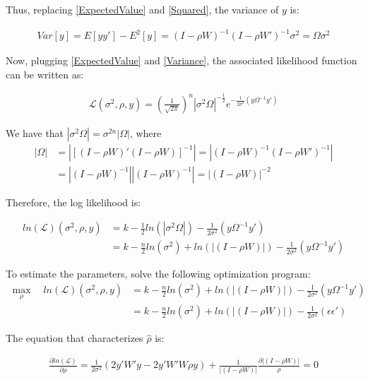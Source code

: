\documentclass[12pt]{article}
\begin{document}
\begin{enumerate}
\begin{enumerate}
\begin{enumerate}
      Thus, replacing \eqref{ExpectedValue} and \eqref{Squared}, the variance of $y$ is:
      
      \begin{align}
          Var[y]= E[yy'] - E^2[y] = (I-\rho W)^{-1} (I-\rho W')^{-1} \sigma^2 = \Omega \sigma^2 \label{Variance}
      \end{align}

     Now, plugging \eqref{ExpectedValue} and \eqref{Variance}, the associated likelihood function can be written as: 
     
     \begin{align*}
     \mathcal{L} (\sigma^2, \rho, y) = \left( \frac{1}{\sqrt{2 \pi}}\right)^n |\sigma^2 \Omega|^{-\frac{1}{2}} e^{-\frac{1}{2\sigma^2} (y \Omega^{-1} y')}
     \end{align*}
     
     We have that $|\sigma^2 \Omega| = \sigma^{2n} |\Omega|$, where
     \begin{align*}
         |\Omega| &= |[(I-\rho W)'(I-\rho W)]^{-1}| = |(I-\rho W)^{-1}(I-\rho W')^{-1}|\\
         &= |(I-\rho W)^{-1}| |(I-\rho W)^{-1}| = |(I-\rho W)|^{-2}
     \end{align*}
      
      Therefore, the log likelihood is:
      
      \begin{align*}
     ln(\mathcal{L}) (\sigma^2, \rho, y) &= k - \frac{1}{2} ln(|\sigma^2 \Omega|) - \frac{1}{2 \sigma^2} (y \Omega^{-1} y')\\
     &= k - \frac{n}{2} ln(\sigma^2) + ln(|(I-\rho W)|) - \frac{1}{2 \sigma^2} (y \Omega^{-1} y')
     \end{align*}
     
     To estimate the parameters, solve the following optimization program:
      \begin{align*}
          \max_{\rho} \quad ln(\mathcal{L}) (\sigma^2, \rho, y) &= k - \frac{n}{2} ln(\sigma^2) + ln(|(I-\rho W)|) - \frac{1}{2 \sigma^2} (y \Omega^{-1} y')\\
          &= k - \frac{n}{2} ln(\sigma^2) + ln(|(I-\rho W)|) - \frac{1}{2 \sigma^2} (\epsilon \epsilon')
      \end{align*}
     
     The equation that characterizes $\hat{\rho}$ is:
     
     \begin{align*}
         \frac{\partial ln(\mathcal{L})}{\partial \rho} = \frac{1}{2\sigma^2} \left(2y'W'y - 2 y'W'W \rho y\right) + \frac{1}{|(I-\rho W)|} \frac{\partial |(I-\rho W)|}{\rho}  = 0
     \end{align*}
     

\end{enumerate}
\end{enumerate}
\end{enumerate}
\end{document}
